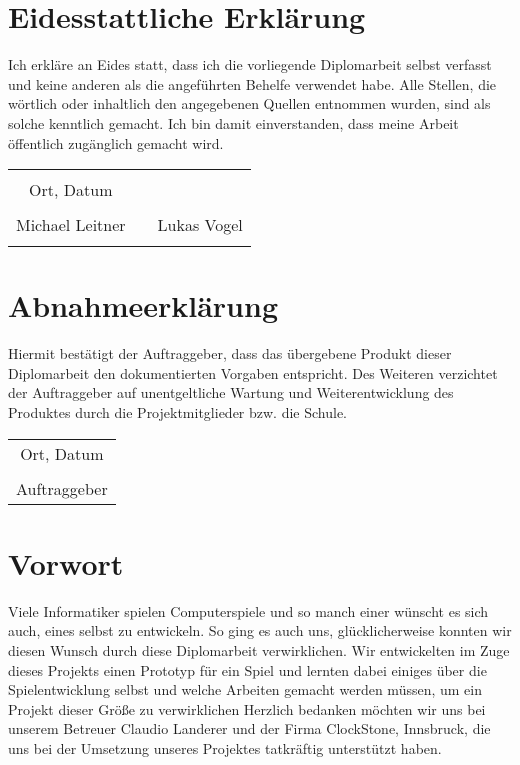 

\chapter*{Eidesstattliche Erklärung}
Ich erkläre an Eides statt, dass ich die vorliegende Diplomarbeit selbst verfasst und keine anderen als die angeführten Behelfe verwendet habe. Alle Stellen, die wörtlich oder inhaltlich den angegebenen Quellen entnommen wurden, sind als solche kenntlich gemacht.
Ich bin damit einverstanden, dass meine Arbeit öffentlich zugänglich gemacht wird.

\vspace{1cm}
\begin{tabular}{c c c}
	& \hspace{4cm} & \\\cline{1-1}
	Ort, Datum & & \\
	\vspace{2cm}
	& & \\\cline{1-1}\cline{3-3}
	Michael Leitner & & Lukas Vogel \\ 
	\vspace{2cm}

\end{tabular}

\chapter*{Abnahmeerklärung}
Hiermit bestätigt der Auftraggeber, dass das übergebene Produkt dieser Diplomarbeit den dokumentierten Vorgaben entspricht. Des Weiteren verzichtet der Auftraggeber auf unentgeltliche Wartung und Weiterentwicklung des Produktes durch die Projektmitglieder bzw. die Schule.

\vspace{1cm}
\begin{tabular}{c}
	\\\cline{1-1}
	Ort, Datum\\
	\vspace{2cm}
	\\\cline{1-1}
	Auftraggeber
\end{tabular}	

\chapter*{Vorwort}
Viele Informatiker spielen Computerspiele und so manch einer wünscht es sich auch, eines selbst zu entwickeln. So ging es auch uns, glücklicherweise konnten wir diesen Wunsch durch diese Diplomarbeit verwirklichen. Wir entwickelten im Zuge dieses Projekts einen Prototyp für ein Spiel und lernten dabei einiges über die Spielentwicklung selbst und welche Arbeiten gemacht werden müssen, um ein Projekt dieser Größe zu verwirklichen
Herzlich bedanken möchten wir uns bei unserem Betreuer Claudio Landerer und der Firma ClockStone, Innsbruck, die uns bei der Umsetzung unseres Projektes tatkräftig unterstützt haben.

